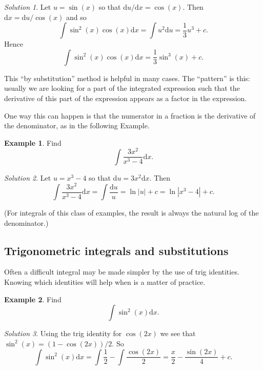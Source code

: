 \documentclass[
  english,
  11pt,
  oneside]{book}
\newcommand{\slide}{}
\newcommand{\cpybx}{}
\newcommand{\ecpybx}{}
\theoremstyle{definition}
\theoremstyle{definition}
\newtheorem{example}{Example}[chapter]
\theoremstyle{definition}
\theoremstyle{definition}
\theoremstyle{remark}
\newtheorem*{solution}{Solution}
\begin{document}
\begin{solution}
Let \(u = \sin(x)\) so that \(\mathrm{d}u/\mathrm{d}x = \cos(x)\). Then \(\mathrm{d}x = \mathrm{d}u/\cos(x)\) and so
\[
\int\sin^2(x)\cos(x)\mathrm{d}x = \int u^2\mathrm{d}u = \frac 13u^3+c.
\]
Hence
\[
\int\sin^2(x)\cos(x)\mathrm{d}x = \frac 13\sin^3(x) + c.
\]
\end{solution}

\slide

This ``by substitution'' method is helpful in many cases. The ``pattern'' is this: usually we are looking for a part of the integrated expression such that the derivative of this part of the expression appears as a factor in the expression.

One way this can happen is that the numerator in a fraction is the derivative of the denominator, as in the following Example.

\cpybx

\begin{example}
Find
\[
\int\frac{3x^2}{x^3-4}\mathrm{d}x.
\]
\end{example}

\ecpybx\slide\copy\copybox

\begin{solution}
Let \(u = x^3-4\) so that \(\mathrm{d}u = 3x^2\mathrm{d}x\). Then
\[
\int\frac{3x^2}{x^3-4}\mathrm{d}x = \int \frac{\mathrm{d}u}{u} = \ln|u|+c = \ln|x^3-4|+c.
\]
\end{solution}

(For integrals of this class of examples, the result is always the natural log of the denominator.)
\slide

\subsection{Trigonometric integrals and substitutions}\label{trigonometric-integrals-and-substitutions}

Often a difficult integral may be made simpler by the use of trig identities. Knowing which identities will help when is a matter of practice.

\begin{example}
Find
\[
\int\sin^2(x) \mathrm{d}x.
\]
\end{example}

\begin{solution}
Using the trig identity for \(\cos(2x)\) we see that \(\sin^2(x) = (1-\cos(2x))/2\). So
\[
\int\sin^2(x) \mathrm{d}x = \int\frac 12-\int\frac{\cos(2x)}{2} = \frac x2-\frac{\sin(2x)}{4}+c.
\]
\end{solution}
\end{document}
